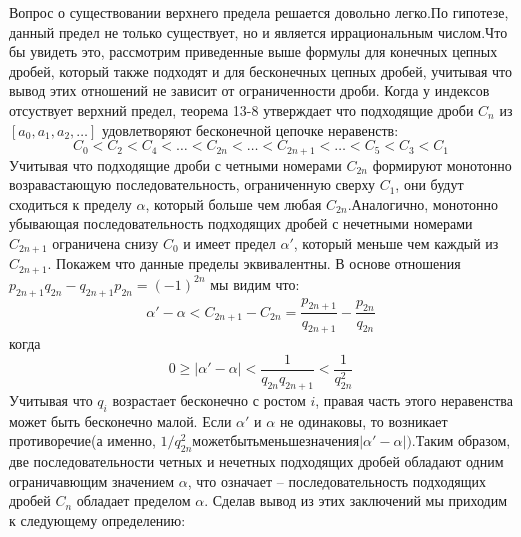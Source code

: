 \documentclass[11pt]{article}
\begin{document}
Вопрос о существовании верхнего предела решается довольно легко.По гипотезе, данный предел не только существует, но и является иррациональным числом.Что бы увидеть это, рассмотрим приведенные выше формулы для конечных цепных дробей, который также подходят и для бесконечных цепных дробей, учитывая что вывод этих отношений не зависит от ограниченности дроби. Когда у индексов отсуствует верхний предел, теорема 13-8 утверждает что подходящие дроби $C_n$ из $[a_0,a_1,a_2,\dots]$ удовлетворяют бесконечной цепочке неравенств:
$$C_0<C_2<C_4<\dots<C_{2n}<\dots<C_{2n+1}<\dots<C_5<C_3<C_1$$
Учитывая что подходящие дроби с четными номерами $C_{2n}$ формируют монотонно возравастающую последовательность, ограниченную сверху $C_1$, они будут сходиться к пределу $\alpha$, который больше чем любая $C_{2n}$.Аналогично, монотонно убывающая последовательность подходящих дробей с нечетными номерами $C_{2n+1}$ ограничена снизу $C_0$ и имеет предел $\alpha'$, который меньше чем каждый из $C_{2n+1}$. Покажем что данные пределы эквивалентны. В основе отношения $p_{2n+1}q_{2n}-q_{2n+1}p_{2n}=(-1)^{2n}$ мы видим что:
$$\alpha'-\alpha<C_{2n+1}-C_{2n}=\frac{p_{2n+1}}{q_{2n+1}}-\frac{p_{2n}}{q_{2n}}$$
когда
$$0\ge|\alpha'-\alpha|<\frac{1}{q_{2n}q_{2n+1}}<\frac{1}{q_{2n}^2}$$
Учитывая что $q_i$ возрастает бесконечно с ростом $i$, правая часть этого неравенства может быть бесконечно малой. Если $\alpha'$ и $\alpha$ не одинаковы, то возникает противоречие(а именно, $1/q_{2n}^2 может быть меньше значения |\alpha'-\alpha|)$.Таким образом, две последовательности четных и нечетных подходящих дробей обладают одним ограничавющим значением $\alpha$, что означает -- последовательность подходящих дробей $C_n$ обладает пределом $\alpha$.
Сделав вывод из этих заключений мы приходим к следующему определению:
\end{document}
